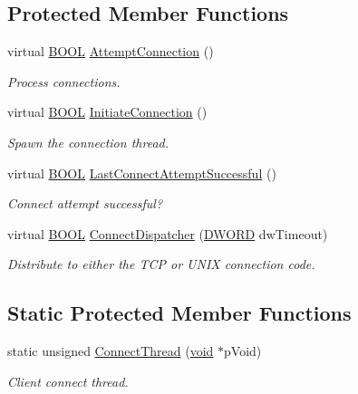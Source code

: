 \subsection*{\-Protected \-Member \-Functions}
\begin{DoxyCompactItemize}
\item 
virtual \hyperlink{_cpclient_8h_a3be13892ae7076009afcf121347dd319}{\-B\-O\-O\-L} \hyperlink{class_c_client_socket_a15b0347d2f84e4cd159c981b3ccced47}{\-Attempt\-Connection} ()
\begin{DoxyCompactList}\small\item\em \-Process connections. \end{DoxyCompactList}\item 
virtual \hyperlink{_cpclient_8h_a3be13892ae7076009afcf121347dd319}{\-B\-O\-O\-L} \hyperlink{class_c_client_socket_a5756e507a9decec591fd607dd34e3a85}{\-Initiate\-Connection} ()
\begin{DoxyCompactList}\small\item\em \-Spawn the connection thread. \end{DoxyCompactList}\item 
virtual \hyperlink{_cpclient_8h_a3be13892ae7076009afcf121347dd319}{\-B\-O\-O\-L} \hyperlink{class_c_client_socket_a49f5369ae8f86af2b6adcd44517964fc}{\-Last\-Connect\-Attempt\-Successful} ()
\begin{DoxyCompactList}\small\item\em \-Connect attempt successful? \end{DoxyCompactList}\item 
virtual \hyperlink{_cpclient_8h_a3be13892ae7076009afcf121347dd319}{\-B\-O\-O\-L} \hyperlink{class_c_client_socket_a335a875fe14301b767049bb5d7f72b6f}{\-Connect\-Dispatcher} (\hyperlink{_x_plat_8h_aa39b39d94407451a6ec0226479db68cf}{\-D\-W\-O\-R\-D} dw\-Timeout)
\begin{DoxyCompactList}\small\item\em \-Distribute to either the \-T\-C\-P or \-U\-N\-I\-X connection code. \end{DoxyCompactList}\end{DoxyCompactItemize}
\subsection*{\-Static \-Protected \-Member \-Functions}
\begin{DoxyCompactItemize}
\item 
static unsigned \hyperlink{class_c_client_socket_a115aa8b14c8685a9f71ecc0b30bed3f6}{\-Connect\-Thread} (\hyperlink{_cpclient_8h_a6464f7480a0fd0ee170cba12b2c0497f}{void} $\ast$p\-Void)
\begin{DoxyCompactList}\small\item\em \-Client connect thread. \end{DoxyCompactList}\end{DoxyCompactItemize}
